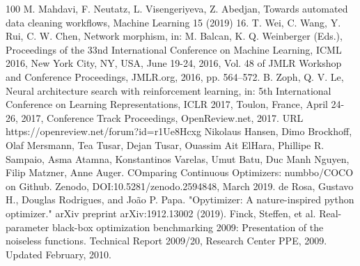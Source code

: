 \documentclass[a4paper,14pt]{extarticle}
\begin{document}
\begin{thebibliography}{100}
     M. Mahdavi, F. Neutatz, L. Visengeriyeva, Z. Abedjan, Towards automated data cleaning workflows, Machine Learning 15 (2019) 16.
     T. Wei, C. Wang, Y. Rui, C. W. Chen, Network morphism, in: M. Balcan, K. Q. Weinberger (Eds.), Proceedings of the 33nd International Conference on Machine Learning, ICML 2016, New York City, NY, USA, June 19-24, 2016, Vol. 48 of JMLR Workshop and Conference Proceedings, JMLR.org, 2016, pp. 564–572.
     B. Zoph, Q. V. Le, Neural architecture search with reinforcement learning, in: 5th International Conference on Learning Representations, ICLR 2017, Toulon, France, April 24-26, 2017, Conference Track Proceedings, OpenReview.net, 2017. URL https://openreview.net/forum?id=r1Ue8Hcxg
     Nikolaus Hansen, Dimo Brockhoff, Olaf Mersmann, Tea Tusar, Dejan Tusar, Ouassim Ait ElHara, Phillipe R. Sampaio, Asma Atamna, Konstantinos Varelas, Umut Batu, Duc Manh Nguyen, Filip Matzner, Anne Auger. COmparing Continuous Optimizers: numbbo/COCO on Github. Zenodo, DOI:10.5281/zenodo.2594848, March 2019.
     de Rosa, Gustavo H., Douglas Rodrigues, and João P. Papa. "Opytimizer: A nature-inspired python optimizer." arXiv preprint arXiv:1912.13002 (2019).
     Finck, Steffen, et al. Real-parameter black-box optimization benchmarking 2009: Presentation of the noiseless functions. Technical Report 2009/20, Research Center PPE, 2009. Updated February, 2010.
    
\end{thebibliography}
\end{document}
